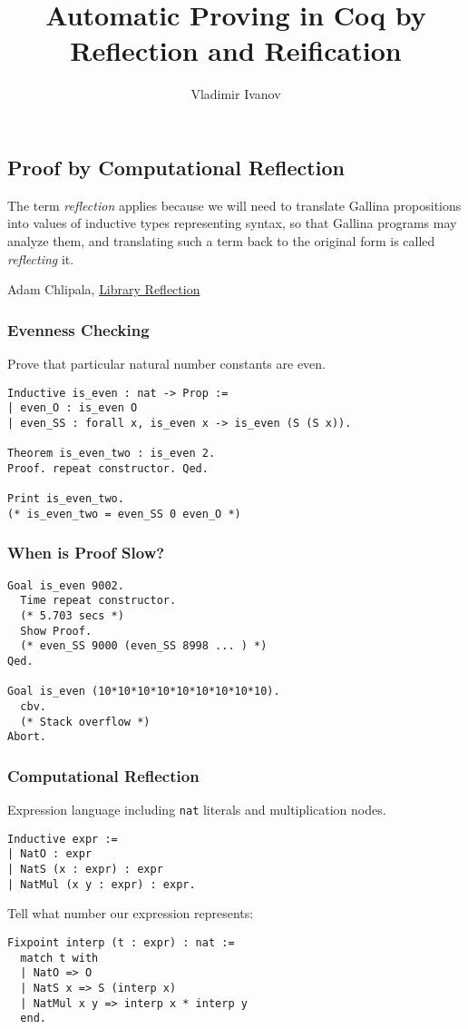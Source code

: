 \documentclass{beamer}
\title{Automatic Proving in Coq by Reflection and Reification}
\author{Vladimir Ivanov}
\institute{Huawei Technologies\\
  Moscow Research Center\\
  Advanced Software Technology Lab
}
\date{}
\begin{document}
\begin{frame}
  \maketitle
\end{frame}

\begin{frame}
  \section{Proof by Computational Reflection}
  \setlength{\epigraphwidth}{\textwidth}
  \epigraph{\justifying
    The term \textit{reflection} applies because we will need to translate Gallina propositions into values of inductive types representing syntax, so that Gallina programs may analyze them, and translating such a term back to the original form is called \textit{reflecting} it.
  }{Adam Chlipala,  \href{http://adam.chlipala.net/cpdt/html/Reflection.html}{Library Reflection}}
\end{frame}

\begin{frame}[fragile]
  \frametitle{Evenness Checking}
  Prove that particular natural number constants are even\footnotemark.
\begin{verbatim}
Inductive is_even : nat -> Prop :=
| even_O : is_even O
| even_SS : forall x, is_even x -> is_even (S (S x)).

Theorem is_even_two : is_even 2.
Proof. repeat constructor. Qed.

Print is_even_two.
(* is_even_two = even_SS 0 even_O *)
\end{verbatim}
  \vspace{1.5em}

\end{frame}

\begin{frame}[fragile]
  \frametitle{When is Proof Slow?}
\begin{verbatim}
Goal is_even 9002.
  Time repeat constructor.
  (* 5.703 secs *)
  Show Proof.
  (* even_SS 9000 (even_SS 8998 ... ) *)
Qed.

Goal is_even (10*10*10*10*10*10*10*10*10).
  cbv.
  (* Stack overflow *)
Abort.
\end{verbatim}
\end{frame}

\begin{frame}[fragile]
  \frametitle{Computational Reflection}
  Expression language including \texttt{nat} literals and multiplication nodes.
\begin{verbatim}
Inductive expr :=
| NatO : expr
| NatS (x : expr) : expr
| NatMul (x y : expr) : expr.
\end{verbatim}
  Tell what number our expression represents:
\begin{verbatim}
Fixpoint interp (t : expr) : nat :=
  match t with
  | NatO => O
  | NatS x => S (interp x)
  | NatMul x y => interp x * interp y
  end.
\end{verbatim}
\end{frame}
\end{document}
